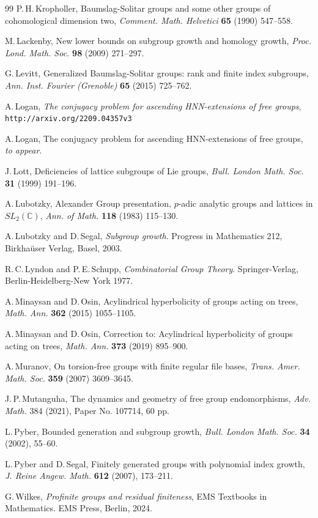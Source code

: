 \documentclass[11pt,reqno]{amsart}
\numberwithin{equation}{section}
\newcommand{\Cc}{\mathbb{C}}
\theoremstyle{definition}
\theoremstyle{remark}
\begin{document}
\begin{thebibliography}{99}
 P.\,H.\,Kropholler,
Baumslag-Solitar groups and some other groups of
cohomological dimension two,
{\it Comment. Math. Helvetici} {\bf 65} (1990) 547--558.

 M.\,Lackenby,
  New lower bounds on subgroup growth and homology growth,
  {\it Proc. Lond. Math. Soc.} {\bf 98} (2009) 271--297.
  
 G.\,Levitt,
Generalized Baumslag-Solitar groups: rank and finite index subgroups,
{\it Ann. Inst. Fourier (Grenoble)} {\bf 65} (2015) 725--762.

  A.\,Logan,
{\it The conjugacy problem for ascending HNN-extensions of free groups},
\texttt{http://arxiv.org/2209.04357v3}

  A.\,Logan,
The conjugacy problem for ascending HNN-extensions of free groups,
{\it to appear}.

 J.\,Lott,
  Deficiencies of lattice subgroups of Lie groups,
  {\it Bull. London Math. Soc.} {\bf 31} (1999) 191--196.


  
 A.\,Lubotzky,
  Alexander Group presentation, $p$-adic analytic groups and lattices in
  $SL_2(\Cc)$,
  {\it Ann. of Math.} {\bf 118} (1983) 115--130. 

 A.\,Lubotzky and D.\,Segal, {\it Subgroup growth}.
Progress in Mathematics 212, Birkha\"user Verlag, Basel, 2003.



 R.\,C.\,Lyndon and P.\,E.\,Schupp,
{\it Combinatorial Group Theory}. Springer-Verlag, Berlin-Heidelberg-New
York 1977.



 A.\,Minaysan and D.\,Osin,
  Acylindrical hyperbolicity of groups acting on trees,
  {\it Math. Ann.} {\bf 362} (2015) 1055--1105. 


  
 A.\,Minaysan and D.\,Osin,
  Correction to: Acylindrical hyperbolicity of groups acting on trees,
  {\it Math. Ann.} {\bf 373} (2019) 895--900.
  

 A.\,Muranov, 
On torsion-free groups with finite regular file bases,
{\it Trans. Amer. Math. Soc.} {\bf 359} (2007) 3609--3645. 


 J.\,P.\,Mutanguha,
  The dynamics and geometry of free group endomorphisms,
  {\it Adv. Math.} 384 (2021), Paper No. 107714, 60 pp.

 L.\,Pyber,
  Bounded generation and subgroup growth,
  {\it Bull. London Math. Soc.} {\bf  34} (2002), 55--60. 

 L.\,Pyber and D.\,Segal,
Finitely generated groups with polynomial index growth,
{\it J. Reine Angew. Math.} {\bf 612} (2007), 173--211.


 G.\,Wilkes,
  {\it   Profinite groups and residual finiteness},
  EMS Textbooks in Mathematics. EMS Press, Berlin, 2024.
\end{thebibliography}
\end{document}
